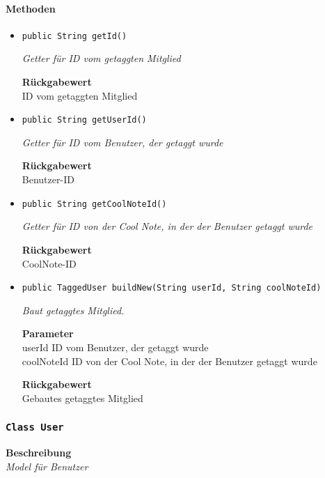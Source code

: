      \paragraph*{Methoden}
     \begin{itemize}
     	\item{\texttt{public String getId()}}
     	
     	\textit{Getter für ID vom getaggten Mitglied}
     	
     	
     	
     	\textbf{Rückgabewert} \\
     	ID vom getaggten Mitglied        \item{\texttt{public String getUserId()}}
     	
     	\textit{Getter für ID vom Benutzer, der getaggt wurde}
     	
     	
     	
     	\textbf{Rückgabewert} \\
     	Benutzer-ID        \item{\texttt{public String getCoolNoteId()}}
     	
     	\textit{Getter für ID von der Cool Note, in der der Benutzer getaggt wurde}
     	
     	
     	
     	\textbf{Rückgabewert} \\
     	CoolNote-ID        \item{\texttt{public TaggedUser buildNew(String userId, String coolNoteId)}}
     	
     	\textit{Baut getaggtes Mitglied.}
     	
     	\textbf{Parameter} \\
     	userId ID vom Benutzer, der getaggt wurde\\
     	coolNoteId ID von der Cool Note, in der der Benutzer getaggt wurde
     	
     	\textbf{Rückgabewert} \\
     	Gebautes getaggtes Mitglied
     \end{itemize}
     \subsubsection{\texttt{Class User}}
     \textbf{Beschreibung} \\
     \textit{Model für Benutzer}
